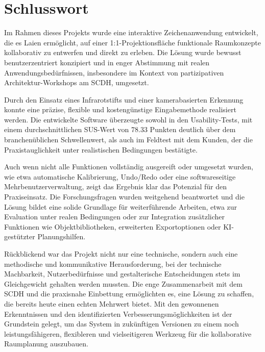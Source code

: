\section{Schlusswort}

Im Rahmen dieses Projekts wurde eine interaktive Zeichenanwendung entwickelt, die es Laien ermöglicht, auf einer 1:1-Projektionsfläche funktionale Raumkonzepte kollaborativ zu entwerfen und direkt zu erleben.  
Die Lösung wurde bewusst benutzerzentriert konzipiert und in enger Abstimmung mit realen Anwendungsbedürfnissen, insbesondere im Kontext von partizipativen Architektur-Workshops am SCDH, umgesetzt.  

Durch den Einsatz eines Infrarotstifts und einer kamerabasierten Erkennung konnte eine präzise, flexible und kostengünstige Eingabemethode realisiert werden.  
Die entwickelte Software überzeugte sowohl in den Usability-Tests, mit einem durchschnittlichen SUS-Wert von 78.33 Punkten deutlich über dem branchenüblichen Schwellenwert, als auch im Feldtest mit dem Kunden, der die Praxistauglichkeit unter realistischen Bedingungen bestätigte.  

Auch wenn nicht alle Funktionen vollständig ausgereift oder umgesetzt wurden, wie etwa automatische Kalibrierung, Undo/Redo oder eine softwareseitige Mehrbenutzerverwaltung, zeigt das Ergebnis klar das Potenzial für den Praxiseinsatz.  
Die Forschungsfragen wurden weitgehend beantwortet und die Lösung bildet eine solide Grundlage für weiterführende Arbeiten, etwa zur Evaluation unter realen Bedingungen oder zur Integration zusätzlicher Funktionen wie Objektbibliotheken, erweiterten Exportoptionen oder KI-gestützter Planungshilfen.  

Rückblickend war das Projekt nicht nur eine technische, sondern auch eine methodische und kommunikative Herausforderung, bei der technische Machbarkeit, Nutzerbedürfnisse und gestalterische Entscheidungen stets im Gleichgewicht gehalten werden mussten.  
Die enge Zusammenarbeit mit dem SCDH und die praxisnahe Einbettung ermöglichten es, eine Lösung zu schaffen, die bereits heute einen echten Mehrwert bietet.  
Mit den gewonnenen Erkenntnissen und den identifizierten Verbesserungsmöglichkeiten ist der Grundstein gelegt, um das System in zukünftigen Versionen zu einem noch leistungsfähigeren, flexibleren und vielseitigeren Werkzeug für die kollaborative Raumplanung auszubauen.  

